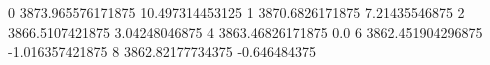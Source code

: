 0 3873.965576171875 10.497314453125
1 3870.6826171875 7.21435546875
2 3866.5107421875 3.04248046875
4 3863.46826171875 0.0
6 3862.451904296875 -1.016357421875
8 3862.82177734375 -0.646484375
